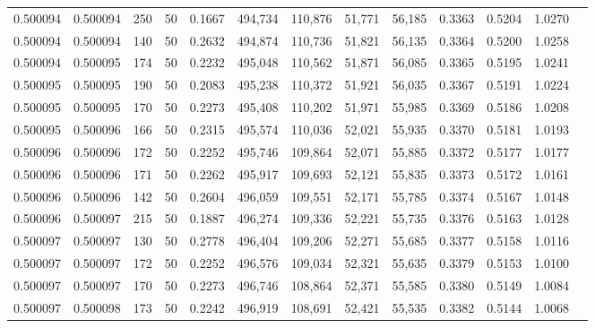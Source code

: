 \begin{tabular}{rrrrrrrrrrrrr}
0.500094 & 0.500094 &   250 &  50 &                                     0.1667 & 494,734 & 110,876 &  51,771 &  56,185 & 0.3363 & 0.5204 & 1.0270 \\
0.500094 & 0.500094 &   140 &  50 &                                     0.2632 & 494,874 & 110,736 &  51,821 &  56,135 & 0.3364 & 0.5200 & 1.0258 \\
0.500094 & 0.500095 &   174 &  50 &                                     0.2232 & 495,048 & 110,562 &  51,871 &  56,085 & 0.3365 & 0.5195 & 1.0241 \\
0.500095 & 0.500095 &   190 &  50 &                                     0.2083 & 495,238 & 110,372 &  51,921 &  56,035 & 0.3367 & 0.5191 & 1.0224 \\
0.500095 & 0.500095 &   170 &  50 &                                     0.2273 & 495,408 & 110,202 &  51,971 &  55,985 & 0.3369 & 0.5186 & 1.0208 \\
0.500095 & 0.500096 &   166 &  50 &                                     0.2315 & 495,574 & 110,036 &  52,021 &  55,935 & 0.3370 & 0.5181 & 1.0193 \\
0.500096 & 0.500096 &   172 &  50 &                                     0.2252 & 495,746 & 109,864 &  52,071 &  55,885 & 0.3372 & 0.5177 & 1.0177 \\
0.500096 & 0.500096 &   171 &  50 &                                     0.2262 & 495,917 & 109,693 &  52,121 &  55,835 & 0.3373 & 0.5172 & 1.0161 \\
0.500096 & 0.500096 &   142 &  50 &                                     0.2604 & 496,059 & 109,551 &  52,171 &  55,785 & 0.3374 & 0.5167 & 1.0148 \\
0.500096 & 0.500097 &   215 &  50 &                                     0.1887 & 496,274 & 109,336 &  52,221 &  55,735 & 0.3376 & 0.5163 & 1.0128 \\
0.500097 & 0.500097 &   130 &  50 &                                     0.2778 & 496,404 & 109,206 &  52,271 &  55,685 & 0.3377 & 0.5158 & 1.0116 \\
0.500097 & 0.500097 &   172 &  50 &                                     0.2252 & 496,576 & 109,034 &  52,321 &  55,635 & 0.3379 & 0.5153 & 1.0100 \\
0.500097 & 0.500097 &   170 &  50 &                                     0.2273 & 496,746 & 108,864 &  52,371 &  55,585 & 0.3380 & 0.5149 & 1.0084 \\
0.500097 & 0.500098 &   173 &  50 &                                     0.2242 & 496,919 & 108,691 &  52,421 &  55,535 & 0.3382 & 0.5144 & 1.0068 \\

\end{tabular}
